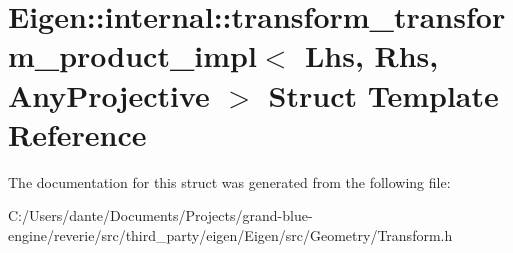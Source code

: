 \hypertarget{struct_eigen_1_1internal_1_1transform__transform__product__impl}{}\section{Eigen\+::internal\+::transform\+\_\+transform\+\_\+product\+\_\+impl$<$ Lhs, Rhs, Any\+Projective $>$ Struct Template Reference}
\label{struct_eigen_1_1internal_1_1transform__transform__product__impl}


The documentation for this struct was generated from the following file\+:\begin{DoxyCompactItemize}
\item 
C\+:/\+Users/dante/\+Documents/\+Projects/grand-\/blue-\/engine/reverie/src/third\+\_\+party/eigen/\+Eigen/src/\+Geometry/Transform.\+h\end{DoxyCompactItemize}
